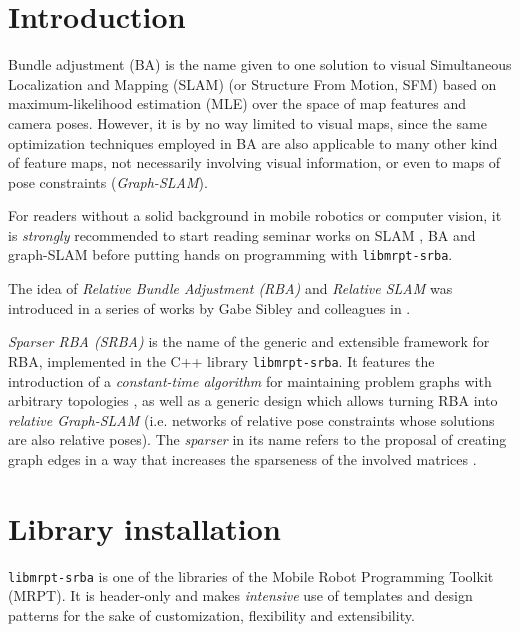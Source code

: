 \documentclass[a4paper,11pt]{article}
\begin{document}
\vspace{1cm}

\newpage
\tableofcontents
\newpage

\section{Introduction}

Bundle adjustment (BA) is the name given to one solution to visual Simultaneous Localization and Mapping (SLAM) (or Structure From Motion, SFM) 
based on maximum-likelihood estimation (MLE) over the space of map features and camera poses. 
However, it is by no way limited to visual maps, since the same 
optimization techniques employed in BA are also applicable to many other 
kind of feature maps, not necessarily involving visual information, or even to maps of pose constraints 
(\emph{Graph-SLAM}).

For readers without a solid background in mobile robotics or computer vision, it is \emph{strongly} recommended 
to start reading seminar works on SLAM \cite{thrun2005pr,durrantwhyte2006sla,bailey2006sla}, 
BA \cite{triggs2000bundle} and graph-SLAM \cite{grisetti2010tgb} before putting hands on
programming with \texttt{libmrpt-srba}.

The idea of \emph{Relative Bundle Adjustment (RBA)} and \emph{Relative SLAM} was introduced in a series 
of works by Gabe Sibley and colleagues in \cite{sibley2009rba,sibley2009adaptive,mei2011rslam}. 

\emph{Sparser RBA (SRBA)} is the name of the generic and extensible framework for RBA, implemented in 
the C++ library \texttt{libmrpt-srba}. It features the introduction of 
a \emph{constant-time algorithm} for maintaining problem graphs with arbitrary topologies \cite{blanco2013srba}, 
as well as a generic design which allows turning RBA 
into \emph{relative Graph-SLAM} (i.e. networks of relative pose constraints whose solutions are also relative poses).
The \emph{sparser} in its name refers to the proposal of creating graph edges in a way that increases the sparseness 
of the involved matrices \cite{blanco2013srba}.

\newpage
\section{Library installation}

\texttt{libmrpt-srba} is one of the libraries of the Mobile Robot Programming Toolkit (MRPT). 
It is header-only and makes \emph{intensive} use of templates and design patterns for the sake of customization, 
flexibility and extensibility. 
\end{document}
